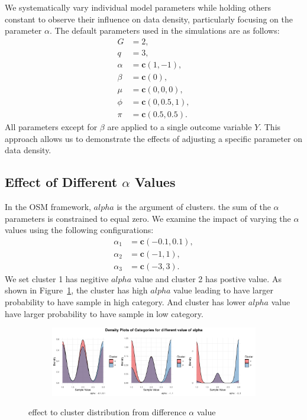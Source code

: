\documentclass{article}
\begin{document}
We systematically vary individual model parameters while holding others constant to observe their influence on data density, particularly focusing on the parameter $\alpha$. The default parameters used in the simulations are as follows:
\[
\begin{aligned}
G &= 2, \\
q &= 3, \\
\alpha &= \mathbf{c}(1, -1), \\
\beta &= \mathbf{c}(0), \\
\mu &= \mathbf{c}(0, 0, 0), \\
\phi &= \mathbf{c}(0, 0.5, 1), \\
\pi &= \mathbf{c}(0.5, 0.5).
\end{aligned}
\]
All parameters except for $\beta$ are applied to a single outcome variable $Y$. This approach allows us to demonstrate the effects of adjusting a specific parameter on data density.

\subsection{Effect of Different $\alpha$ Values}
In the OSM framework, $alpha$ is the argument of clusters. the sum of the $\alpha$ parameters is constrained to equal zero. 
We examine the impact of varying the $\alpha$ values using the following configurations:
\[
\begin{aligned}
\alpha_1 &= \mathbf{c}(-0.1, 0.1), \\
\alpha_2 &= \mathbf{c}(-1, 1), \\
\alpha_3 &= \mathbf{c}(-3, 3).
\end{aligned}
\]
We set cluster 1 has negitive $alpha$ value and cluster 2 has postive value.
As shown in Figure~\ref{fig:alpha}, 
the cluster has high $alpha$ value leading to have larger probability to have sample in high category.
And cluster has lower $alpha$ value have larger probability to have sample in low category.

\begin{figure}[htbp!]
  \centering
  \begin{subfigure}{1.0\textwidth}
      \centering
      \includegraphics[width=\textwidth]{images/para_sim/alpha.png}
  \end{subfigure}
  \caption{effect to cluster distribution from difference $\alpha$ value}
  \label{fig:alpha}
\end{figure}
\end{document}
